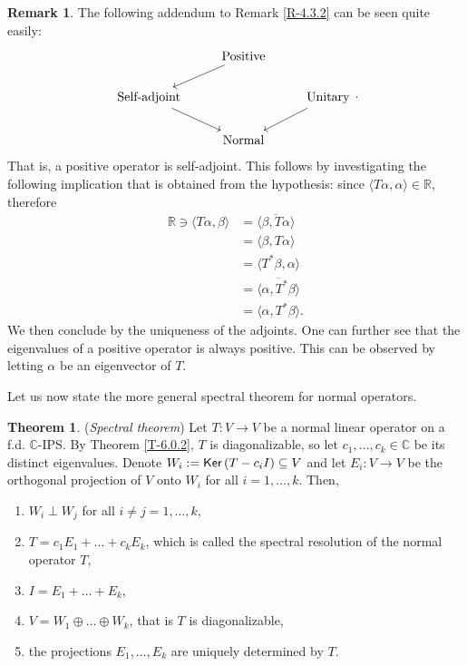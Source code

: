 \documentclass[letterpaper,11pt,twoside]{article}
\theoremstyle{definition}
\theoremstyle{definition}
\newtheorem{theorem}[proposition]{Theorem}
\theoremstyle{definition}
\newtheorem{remark}[proposition]{\textbf{Remark}}
\theoremstyle{definition}
\theoremstyle{definition}
\theoremstyle{definition}
\theoremstyle{remark}
\theoremstyle{definition}
\newcommand{\Ker}[1]{{\fontfamily{lmss}\selectfont 
		\text{Ker}\left (#1\right )
}}
\newcommand{\R}[0]{\mathbb{R}}
\newcommand{\ip}[2]{\langle #1,#2 \rangle}
\newcommand{\conj}[1]{\overline{#1}}
\newcommand{\C}{\mathbb{C}}
\begin{document}
    \begin{remark}\label{R-6.0.5}
    	The following addendum to Remark \ref{R-4.3.2} can be seen quite easily:
    	\[\begin{tikzcd}
    		& {\text{Positive}} \\
    		{\text{Self-adjoint}} && {\text{Unitary}} \\
    		& {\text{Normal}}
    		\arrow[from=2-1, to=3-2]
    		\arrow[from=2-3, to=3-2]
    		\arrow[from=1-2, to=2-1]
    	\end{tikzcd}.\]
    	That is, a positive operator is self-adjoint. This follows by investigating the following implication that is obtained from the hypothesis: since $ \ip{T\alpha}{\alpha} \in \R $, therefore
    	\begin{align*}
    		\R\ni \ip{T\alpha}{\beta} &= \conj{\ip{\beta}{T\alpha}}\\ 
    		&= \ip{\beta}{T\alpha}\\
    			&= \ip{T^{*}\beta}{\alpha}\\
    			&= \conj{\ip{\alpha}{T^{*}\beta}}\\
    			&= \ip{\alpha}{T^{*}\beta}.
    	\end{align*}
    	We then conclude by the uniqueness of the adjoints. One can further see that the eigenvalues of a positive operator is always positive. This can be observed by letting $ \alpha $ be an eigenvector of $ T $.
    \end{remark}
   	Let us now state the more general spectral theorem for normal operators.
   	\begin{theorem}\label{T-6.0.6}
   		(\textit{Spectral theorem}) Let $ T : V\to V $ be a normal linear operator on a f.d. $ \C $-IPS. By Theorem \ref{T-6.0.2}, $ T $ is diagonalizable, so let $ c_1,\dots,c_k\in \C $ be its distinct eigenvalues. Denote $ W_i := \Ker{T-c_iI} \subseteq V$ and let $ E_i : V\to V $ be the orthogonal projection of $ V $ onto $ W_i $ for all $ i=1,\dots,k $. Then,
   		\begin{enumerate}
   			\item {$ W_i \perp W_j $ for all $ i\neq j = 1,\dots,k$,}
   			\item {$ T = c_1E_1 + \dots +c_k E_k $, which is called the spectral resolution of the normal operator $ T $,}
   			\item {$ I = E_1+ \dots + E_k $,}
   			\item {$ V = W_1 \oplus\dots \oplus W_k $, that is $ T $ is diagonalizable,}
   			\item {the projections $ E_1,\dots,E_k $ are uniquely determined by $ T $.}
   		\end{enumerate}
   	\end{theorem}
\end{document}
